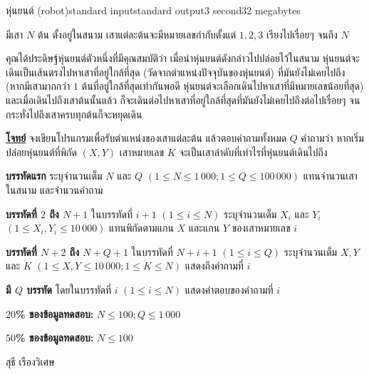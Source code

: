 \documentclass[11pt,a4paper]{article}
\begin{document}
\begin{problem}{หุ่นยนต์ (robot)}{standard input}{standard output}{3 second}{32 megabytes}

มีเสา $N$ ต้น ตั้งอยู่ในสนาม เสาแต่ละต้นจะมีหมายเลขกำกับตั้งแต่ $1, 2, 3$ เรียงไปเรื่อยๆ จนถึง $N$

คุณได้ประดิษฐ์หุ่นยนต์ตัวหนึ่งที่มีคุณสมบัติว่า เมื่อนำหุ่นยนต์ดังกล่าวไปปล่อยไว้ในสนาม หุ่นยนต์จะเดินเป็นเส้นตรงไปหาเสาที่อยู่ใกล้ที่สุด (วัดจากตำแหน่งปัจจุบันของหุ่นยนต์) ที่มันยังไม่เคยไปถึง (หากมีเสามากกว่า $1$ ต้นที่อยู่ใกล้ที่สุดเท่ากันพอดี หุ่นยนต์จะเลือกเดินไปหาเสาที่มีหมายเลขน้อยที่สุด) และเมื่อเดินไปถึงเสาต้นนั้นแล้ว ก็จะเดินต่อไปหาเสาที่อยู่ใกล้ที่สุดที่มันยังไม่เคยไปถึงต่อไปเรื่อยๆ จนกระทั่งไปถึงเสาครบทุกต้นก็จะหยุดเดิน

\bigskip
\underline{\textbf{โจทย์}}  จงเขียนโปรแกรมเพื่อรับตำแหน่งของเสาแต่ละต้น แล้วตอบคำถามทั้งหมด $Q$ คำถามว่า หากเริ่มปล่อยหุ่นยนต์ที่พิกัด $(X, Y)$ เสาหมายเลข $K$ จะเป็นเสาลำดับที่เท่าไรที่หุ่นยนต์เดินไปถึง



\InputFile

\textbf{บรรทัดแรก} ระบุจำนวนเต็ม $N$ และ $Q $ $(1 \leq  N \leq 1\,000; 1 \leq Q \leq 100\,000)$ แทนจำนวนเสาในสนาม และจำนวนคำถาม

\textbf{บรรทัดที่ $2$ ถึง $N+1$}  ในบรรทัดที่ $i+1$ $(1 \leq i \leq N)$ ระบุจำนวนเต็ม $X_i$ และ $Y_i$ $(1 \leq X_i,Y_i \leq 10\,000)$ แทนพิกัดตามแกน $X$ และแกน $Y$ ของเสาหมายเลข $i$

\textbf{บรรทัดที่ $N+2$ ถึง $N+Q+1$} ในบรรทัดที่ $N+i+1$ $(1 \leq i \leq Q)$ ระบุจำนวนเต็ม $X, Y$ และ $K$ $(1 \leq X,Y \leq 10\,000; 1 \leq K \leq N)$ แสดงถึงคำถามที่ $i$



\OutputFile

\textbf{มี $Q$ บรรทัด} โดยในบรรทัดที่ $i$ $(1 \leq i \leq N)$ แสดงคำตอบของคำถามที่ $i$

\Examples

\begin{example}
%
%
\end{example}

\Scoring

\textbf{$20$\% ของข้อมูลทดสอบ:} $N \leq 100;Q \leq 1\,000$

\textbf{$50$\% ของข้อมูลทดสอบ:} $N \leq 100$

\Source

สุธี เรืองวิเศษ


\end{problem}
\end{document}
